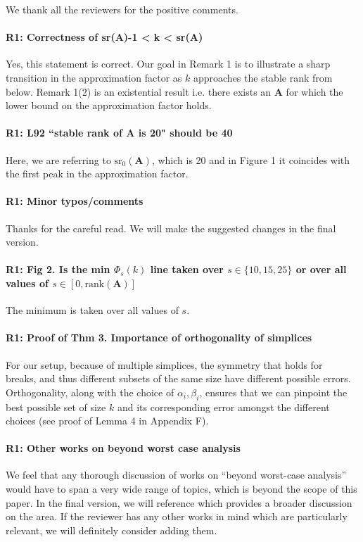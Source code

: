 \documentclass{article}
\begin{document}
We thank all the reviewers for the positive comments. 

\paragraph{R1: Correctness of sr(A)-1 < k < sr(A)} 
Yes, this statement is correct. Our goal in Remark 1 is to illustrate a sharp transition in the approximation factor as $k$ approaches the stable rank from below. Remark 1(2) is an existential result i.e. there exists an $\mathbf{A}$ for which the lower bound on the approximation factor holds. 
\vspace{-2mm}
\paragraph{R1: L92 ``stable rank of A is 20" should be 40}
Here, we are referring to $\text{sr}_0(\mathbf{A})$, which is 20 and in Figure
1 it coincides with the first peak in the approximation factor.
\vspace{-2mm}
\paragraph{R1: Minor typos/comments}
Thanks for the careful read. We will make the suggested changes in the final version.
\vspace{-2mm}
\paragraph{R1: Fig 2.  Is the min $\Phi_s(k)$ line taken over $s\in\{10, 15, 25\}$ or over all values of $s\in [0,\text{rank}(\mathbf{A})]$ } The minimum is taken over all values of $s$. 
\vspace{-2mm}
\paragraph{R1: Proof of Thm 3. Importance of orthogonality of simplices}
For our setup, because of multiple simplices, the symmetry that holds for~\citet{pca-volume-sampling} breaks, and thus different subsets of the same size have different possible errors. Orthogonality, along with the choice of $\alpha_i, \beta_i$, ensures that we can pinpoint the best possible set of size $k$ and its corresponding error amongst the different choices (see proof of Lemma 4 in Appendix F). 
\vspace{-2mm}
\paragraph{R1: Other works on beyond worst case analysis}
We feel that any thorough discussion of works on ``beyond worst-case
analysis'' would have to span a very wide range of topics, which is
beyond the scope of this paper. In the final version, we will
reference \cite{roughgarden2019beyond} which provides a broader discussion on the area.
If the reviewer has any other works in mind which are particularly
relevant, we will definitely consider adding them. 
\end{document}
